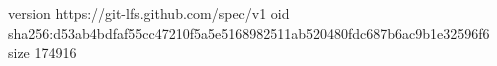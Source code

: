 version https://git-lfs.github.com/spec/v1
oid sha256:d53ab4bdfaf55cc47210f5a5e5168982511ab520480fdc687b6ac9b1e32596f6
size 174916

